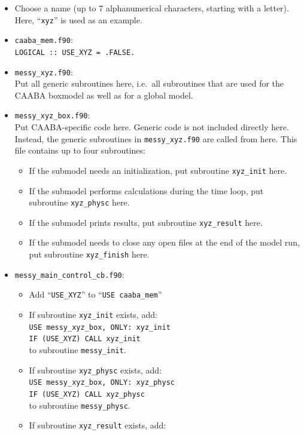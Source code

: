 \documentclass[twoside]{article}
\begin{document}
\begin{itemize}
\item Choose a name (up to 7 alphanumerical characters, starting with a
  letter). Here, ``\verb|xyz|'' is used as an example.
\item \verb|caaba_mem.f90|:\\
  \verb|LOGICAL :: USE_XYZ = .FALSE.|
\item \verb|messy_xyz.f90|:\\
  Put all generic subroutines here, i.e.\ all subroutines that are used
  for the CAABA boxmodel as well as for a global model.
\item \verb|messy_xyz_box.f90|:\\
  Put CAABA-specific code here. Generic code is not included directly
  here. Instead, the generic subroutines in \verb|messy_xyz.f90| are
  called from here. This file contains up to four subroutines:
  \begin{itemize}
  \item If the submodel needs an initialization, put subroutine
    \verb|xyz_init| here.
  \item If the submodel performs calculations during the time loop, put
    subroutine \verb|xyz_physc| here.
  \item If the submodel prints results, put subroutine \verb|xyz_result|
    here.
  \item If the submodel needs to close any open files at the end of the
    model run, put subroutine \verb|xyz_finish| here.
  \end{itemize}
\item \verb|messy_main_control_cb.f90|:
  \begin{itemize}
  \item Add ``\verb|USE_XYZ|'' to ``\verb|USE caaba_mem|''
  \item If subroutine \verb|xyz_init| exists, add:\\
    \verb|USE messy_xyz_box, ONLY: xyz_init|\\
    \verb|IF (USE_XYZ) CALL xyz_init|\\
    to subroutine \verb|messy_init|.
  \item If subroutine \verb|xyz_physc| exists, add:\\
    \verb|USE messy_xyz_box, ONLY: xyz_physc|\\
    \verb|IF (USE_XYZ) CALL xyz_physc|\\
    to subroutine \verb|messy_physc|.
  \item If subroutine \verb|xyz_result| exists, add:\\

\end{itemize}
\end{itemize}
\end{document}
